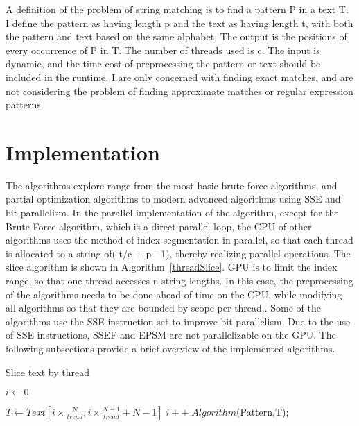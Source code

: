 \documentclass[11pt]{article}       %
\begin{document}
A definition of the problem of string matching is to find a pattern P in a text T.  I define the pattern as having length p and the text as having length t, with both the pattern and text based on the same alphabet. The output is the positions of every occurrence of P in T. The number of threads used is c. The input is dynamic, and the time cost of preprocessing the pattern or text should be included in the runtime. I are only concerned with finding exact matches, and are not considering the problem of finding approximate matches or regular expression patterns.





\section{Implementation} \label{proposedSolution}

The algorithms explore range from the most basic brute force algorithms, and partial optimization algorithms to modern advanced algorithms using SSE and bit parallelism. In the parallel implementation of the algorithm, except for the Brute Force algorithm, which is a direct parallel loop, the CPU of other algorithms uses the method of index segmentation in parallel, so that each thread is allocated to a string of( t/c + p - 1), thereby realizing parallel operations. The slice algorithm is shown in Algorithm~\ref{threadSlice}. GPU is to limit the index range, so that one thread accesses n string lengths. In this case, the preprocessing of the algorithms needs to be done ahead of time on the CPU, while modifying all algorithms so that they are bounded by scope per thread.. Some of the algorithms use the SSE instruction set to improve bit parallelism, Due to the use of SSE instructions, SSEF and EPSM are not parallelizable on the GPU. The following subsections provide a brief overview of the implemented algorithms.




\begin{algorithm}[hbt!]
\caption{Slice text by thread}\label{threadSlice}
$i \gets 0$\;
   { 
  $T \gets Text[i \times \frac{N}{tread}, i \times \frac{N+1}{tread} + N - 1]\;
  
  i++\;
  Algorithm($Pattern,T);
  
 }
\end{algorithm}
\end{document}
